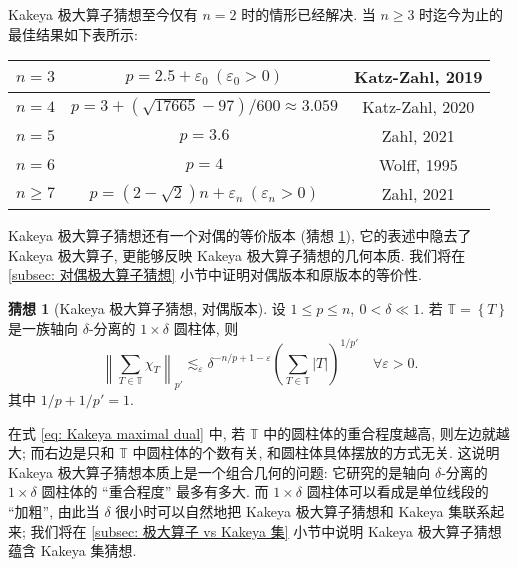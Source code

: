\documentclass[a4paper]{article}
\numberwithin{equation}{section}
\numberwithin{figure}{section}
\numberwithin{table}{section}
\theoremstyle{definition}
\newtheorem{conjecture}[theorem]{\indent 猜想}
\newcommand{\abs}[1]{\left\lvert #1 \right\rvert}
\newcommand{\norm}[1]{\left\lVert #1 \right\rVert}
\newcommand{\set}[1]{\left\{ #1 \right\}}
\renewcommand{\leq}{\leqslant}
\renewcommand{\geq}{\geqslant}
\newcommand{\mb}[1]{\mathbb{#1}}
\newcommand{\ls}{\lesssim}
\newcommand{\R}{\mathbb{R}}
\newcommand{\e}{\varepsilon}
\begin{document}
Kakeya 极大算子猜想至今仅有 $n=2$ 时的情形已经解决\cite{davies1971some}. 当 $n\geq 3$ 时迄今为止的最佳结果如下表所示:

\begin{center}
    \begin{tabular}{c|c|c}
        $n=3$ & $p = 2.5 + \e_0\ (\e_0>0)$ & Katz-Zahl, 2019\cite{katz2019improved}\\
        \hline
        $n=4$ & $p = 3 + (\sqrt{17665}-97)/600\approx 3.059$ & Katz-Zahl, 2020\cite{katz2020kakeya}\\
        \hline
        $n=5$ & $p = 3.6$ & Zahl, 2021\cite{zahl2021new}\\
        \hline
        $n=6$ & $p = 4$ & Wolff, 1995\cite{wolff1995improved}\\
        \hline
        $n\geq 7$ & $p = (2-\sqrt{2})n + \e_n\ (\e_n>0)$ & Zahl, 2021\cite{zahl2021new}
    \end{tabular}
\end{center}


Kakeya 极大算子猜想还有一个对偶的等价版本 (猜想 \ref{conj: 极大算子猜想, 对偶版本}), 它的表述中隐去了 Kakeya 极大算子, 更能够反映 Kakeya 极大算子猜想的几何本质. 我们将在 \ref{subsec: 对偶极大算子猜想} 小节中证明对偶版本和原版本的等价性.

\begin{conjecture}[Kakeya 极大算子猜想, 对偶版本]
    \label{conj: 极大算子猜想, 对偶版本}
    设 $1\leq p\leq n,\ 0<\delta\ll 1$. 若 $\mb{T}=\set{T}$ 是一族轴向 $\delta$-分离的 $1\times\delta$ 圆柱体, 则
    \begin{equation}
        \label{eq: Kakeya maximal dual}
        \norm{\sum_{T\in\mb{T}} \chi_T}_{p'}\ls_\e\delta^{-n/p+1-\e}\left(\sum_{T\in\mb{T}}\abs{T}\right)^{1/p'}\quad\forall\e>0.
    \end{equation}
    其中 $1/p+1/p'=1$.
\end{conjecture}

在式 \eqref{eq: Kakeya maximal dual} 中, 若 $\mb{T}$ 中的圆柱体的重合程度越高, 则左边就越大; 而右边是只和 $\mb{T}$ 中圆柱体的个数有关, 和圆柱体具体摆放的方式无关. 这说明 Kakeya 极大算子猜想本质上是一个组合几何的问题: 它研究的是轴向 $\delta$-分离的 $1\times\delta$ 圆柱体的 ``重合程度'' 最多有多大. 而 $1\times\delta$ 圆柱体可以看成是单位线段的 ``加粗'', 由此当 $\delta$ 很小时可以自然地把 Kakeya 极大算子猜想和 Kakeya 集联系起来; 我们将在 \ref{subsec: 极大算子 vs Kakeya 集} 小节中说明 Kakeya 极大算子猜想蕴含 Kakeya 集猜想.
\end{document}
